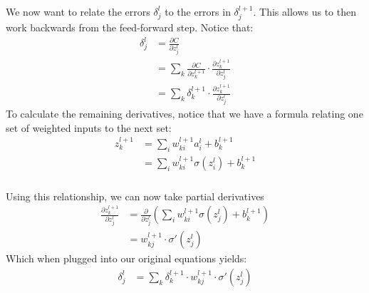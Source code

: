 \documentclass[xetex,mathserif,serif,aspectratio=169]{beamer}
\begin{document}
\begin{frame}[fragile] \frametitle{} \oldB \small


We now want to relate the errors $\delta_j^l$ to the errors in $\delta_j^{l+1}$.
This allows us to then work backwards from the feed-forward step.
Notice that:
\begin{align*}
\delta_j^l &= \frac{\partial C}{ \partial z_j^l} \\
&= \sum_k \frac{\partial C}{ \partial z_k^{l+1}} \cdot \frac{\partial z_k^{l+1}}{ \partial z_j^l} \\
&= \sum_k \delta_k^{l+1} \cdot \frac{\partial z_k^{l+1}}{ \partial z_j^l}
\end{align*}
\pause To calculate the remaining derivatives, notice that we have a formula relating
one set of weighted inputs to the next set:
\begin{align*}
z^{l+1}_k &= \sum_{i} w^{l+1}_{ki} a^l_i + b_k^{l+1} \\
&= \sum_i w^{l+1}_{ki} \sigma(z_i^l) + b_k^{l+1}
\end{align*}

\end{frame}

\begin{frame}[fragile] \frametitle{} \oldB \small


Using this relationship, we can now take partial derivatives
\begin{align*}
\frac{\partial z^{l+1}_k}{ \partial z^{l}_j}
&= \frac{\partial}{ \partial z^{l}_j} \left( \sum_i w^{l+1}_{ki} \sigma(z_j^l) + b_k^{l+1} \right) \\
&= w^{l+1}_{kj} \cdot \sigma'(z_j^l)
\end{align*}
Which when plugged into our original equations yields:
\begin{align*}
\delta_j^l &= \sum_k \delta_k^{l+1} \cdot w^{l+1}_{kj} \cdot \sigma'(z_j^l)
\end{align*}

\end{frame}
\end{document}
